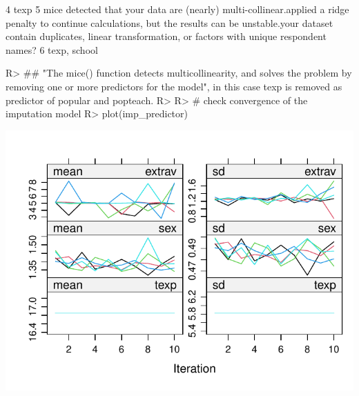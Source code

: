 \documentclass[
]{jss}
\begin{document}
\begin{CodeChunk}
\begin{CodeOutput}
4                                                                                                                                                                                                                                                     texp
5 mice detected that your data are (nearly) multi-collinear.\nIt applied a ridge penalty to continue calculations, but the results can be unstable.\nDoes your dataset contain duplicates, linear transformation, or factors with unique respondent names?
6                                                                                                                                                                                                                                             texp, school
\end{CodeOutput}
\begin{CodeInput}
R> ## "The mice() function detects multicollinearity, and solves the problem by removing one or more predictors for the model", in this case texp is removed as predictor of popular and popteach.
R> 
R> # check convergence of the imputation model
R> plot(imp_predictor)
\end{CodeInput}


\begin{center}\includegraphics{Manuscript_files/figure-latex/pop-predictor-1} \end{center}




\end{CodeChunk}
\end{document}
